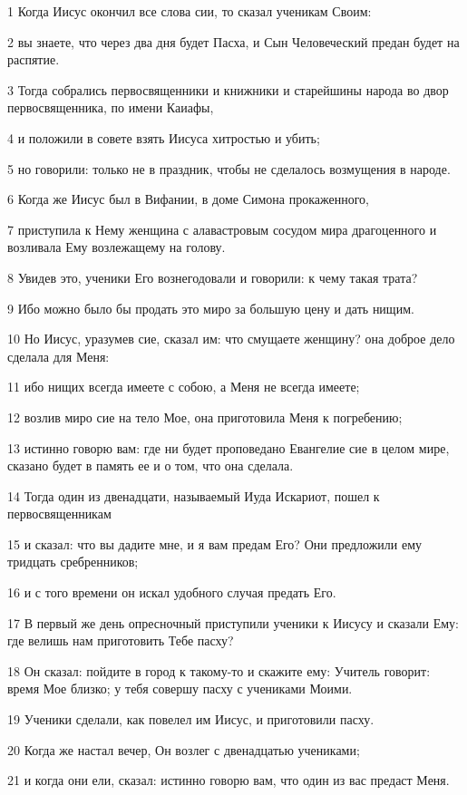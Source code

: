 \par 1 Когда Иисус окончил все слова сии, то сказал ученикам Своим:
\par 2 вы знаете, что через два дня будет Пасха, и Сын Человеческий предан будет на распятие.
\par 3 Тогда собрались первосвященники и книжники и старейшины народа во двор первосвященника, по имени Каиафы,
\par 4 и положили в совете взять Иисуса хитростью и убить;
\par 5 но говорили: только не в праздник, чтобы не сделалось возмущения в народе.
\par 6 Когда же Иисус был в Вифании, в доме Симона прокаженного,
\par 7 приступила к Нему женщина с алавастровым сосудом мира драгоценного и возливала Ему возлежащему на голову.
\par 8 Увидев это, ученики Его вознегодовали и говорили: к чему такая трата?
\par 9 Ибо можно было бы продать это миро за большую цену и дать нищим.
\par 10 Но Иисус, уразумев сие, сказал им: что смущаете женщину? она доброе дело сделала для Меня:
\par 11 ибо нищих всегда имеете с собою, а Меня не всегда имеете;
\par 12 возлив миро сие на тело Мое, она приготовила Меня к погребению;
\par 13 истинно говорю вам: где ни будет проповедано Евангелие сие в целом мире, сказано будет в память ее и о том, что она сделала.
\par 14 Тогда один из двенадцати, называемый Иуда Искариот, пошел к первосвященникам
\par 15 и сказал: что вы дадите мне, и я вам предам Его? Они предложили ему тридцать сребренников;
\par 16 и с того времени он искал удобного случая предать Его.
\par 17 В первый же день опресночный приступили ученики к Иисусу и сказали Ему: где велишь нам приготовить Тебе пасху?
\par 18 Он сказал: пойдите в город к такому-то и скажите ему: Учитель говорит: время Мое близко; у тебя совершу пасху с учениками Моими.
\par 19 Ученики сделали, как повелел им Иисус, и приготовили пасху.
\par 20 Когда же настал вечер, Он возлег с двенадцатью учениками;
\par 21 и когда они ели, сказал: истинно говорю вам, что один из вас предаст Меня.
